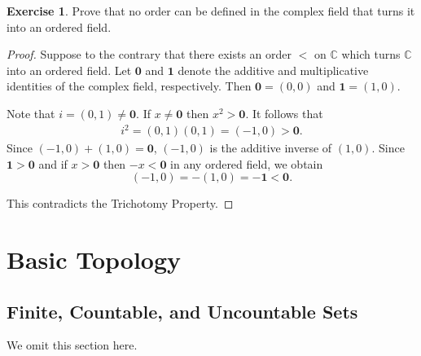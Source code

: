\documentclass[11pt]{article}
\theoremstyle{definition}
\newtheorem{exercise}{Exercise}
\theoremstyle{plain}
\theoremstyle{remark}
\newcommand{\C}{\mathbb{C}}
\begin{document}
\begin{exercise}
Prove that no order can be defined in the complex field that turns it into an ordered field.
\end{exercise}
\begin{proof}
Suppose to the contrary that there exists an order $<$ on $\C$ which turns $\C$ into an ordered field.
Let $\mathbf{0}$ and $\mathbf{1}$ denote the additive and multiplicative identities of the complex field, respectively. 
Then $\mathbf{0}=(0,0)$ and $\mathbf{1}=(1,0)$. 

Note that $i = (0,1) \neq \mathbf{0}$.
If $x \neq \mathbf{0}$ then $x^2 > \mathbf{0}$. 
It follows that
\begin{align*}
    i^2=(0,1)(0,1)=(-1,0)>\mathbf{0}.
\end{align*}
Since $(-1,0)+(1,0)=\mathbf{0}$, $(-1,0)$ is the additive inverse of $(1,0)$. 
Since $\mathbf{1}>\mathbf{0}$ and if $x>\mathbf{0}$ then $-x<\mathbf{0}$ in any ordered field, we obtain
\[
(-1,0)=-(1,0)=-\mathbf{1}<\mathbf{0}.
\]

This contradicts the Trichotomy Property. 
\end{proof}
\section{Basic Topology}
\subsection{Finite, Countable, and Uncountable Sets}
We omit this section here.
\end{document}

